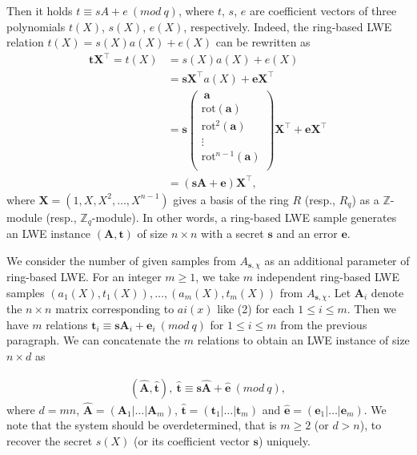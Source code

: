 \documentclass[12pt,a4paper]{article}
\numberwithin{equation}{section}
\begin{document}
Then it holds $t \equiv sA + e \ (mod \ q)$, where $t$, $s$, $e$ are coefficient vectors of three polynomials $t(X)$, $s(X)$, $e(X)$, respectively. Indeed, the ring-based LWE relation $t(X) = s(X)a(X) + e(X)$ can be rewritten as
\begin{align}
    \mathbf{t}\mathbf{X}^\top = t(X) &= s(X)a(X) + e(X) \\
    &= \mathbf{s}\mathbf{X}^\top a(X) + \mathbf{e}\mathbf{X}^\top \\
    &= \mathbf{s} \left( \begin{matrix}
        \ \mathbf{a} \\ \mathrm{rot}(\mathbf{a}) \\ \mathrm{rot}^2(\mathbf{a}) \\ \vdots \\ \mathrm{rot}^{n-1}(\mathbf{a}) \\
    \end{matrix} \right) \mathbf{X}^\top + \mathbf{e}\mathbf{X}^\top\\
    & = (\mathbf{s}\mathbf{A} + \mathbf{e})\mathbf{X}^\top,
\end{align}
where $\mathbf{X} = (1, X, X^2, \ldots , X^{n-1})$ gives a basis of the ring $R$ (resp., $R_q$) as a $\mathbb{Z}$-module (resp., $\mathbb{Z}_q$-module).
In other words, a ring-based LWE sample generates an LWE instance $(\mathbf{A}, \mathbf{t})$ of size $n \times n$ with a secret $\mathbf{s}$ and an error $\mathbf{e}$.

We consider the number of given samples from $A_{\mathbf{s},\chi}$ as an additional parameter of ring-based LWE. For an integer $m \geq 1$, we take $m$ independent ring-based LWE samples $(a_1(X), t_1(X)) ,\ldots, (a_m(X), t_m(X))$ from $A_{\mathbf{s},\chi}$. Let $\mathbf{A}_i$ denote the $n \times n$ matrix corresponding to $ai(x)$ like (2) for each $1 \leq i \leq m$. Then we have $m$ relations $\mathbf{t}_i \equiv \mathbf{s}\mathbf{A}_i + \mathbf{e}_i \ (mod \ q)$ for $1 \leq i \leq m$ from the previous paragraph. We can concatenate the $m$ relations to obtain an LWE instance of size $n \times d$ as

\begin{align}
    (\mathbf{\hat{A}},\mathbf{\hat{t}}), \  \mathbf{\hat{t}} \equiv \mathbf{s}\mathbf{\hat{A}} + \mathbf{\hat{e}} \ (mod \ q),
\end{align}
where $d = mn$, $\mathbf{\hat{A}} = (\mathbf{A}_1 | \ldots | \mathbf{A}_m)$, $\mathbf{\hat{t}} = (\mathbf{t}_1 | \ldots | \mathbf{t}_m)$ and $\mathbf{\hat{e}} = (\mathbf{e}_1 | \ldots | \mathbf{e}_m)$.
We note that the system should be overdetermined, that is $m \geq 2$ (or $d > n$), to recover the secret $s(X)$ (or its coefficient vector $\mathbf{s}$) uniquely.
\end{document}

